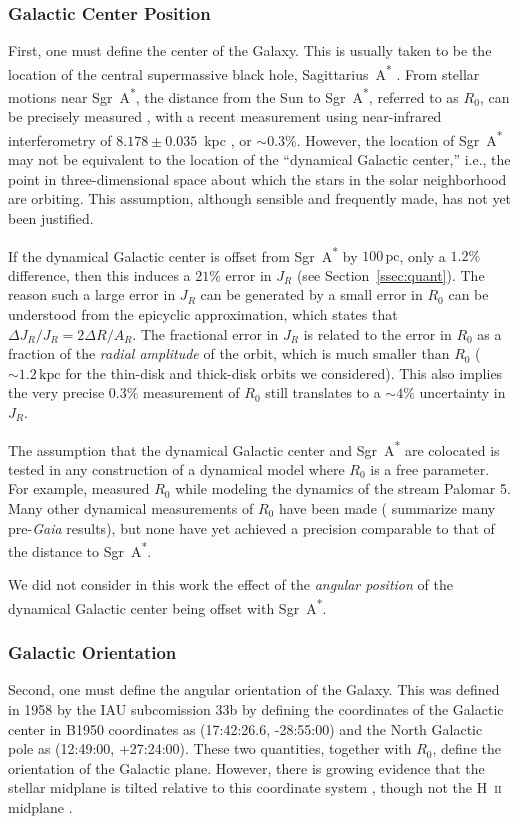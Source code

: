 \documentclass[twocolumn]{aastex62}
\newcommand{\pc}{\text{pc}}
\newcommand{\kpc}{\text{kpc}}
\newcommand{\sgra}{Sgr~A\textsuperscript{*}}
\begin{document}
\subsubsection{Galactic Center Position}
First, one must define the center of the Galaxy. This is usually taken to be
the location of the central supermassive black hole, Sagittarius~A\textsuperscript{*}
\citep[\sgra{}, e.g.][]{2004ApJ...616..872R}. From stellar motions near
\sgra{}, the distance from the Sun to \sgra{}, referred to as $R_0$, can be
precisely measured \citep{2009ApJ...692.1075G, 2018AA...615L..15G}, with a
recent measurement using near-infrared interferometry of $8.178 \pm 0.035$~kpc
\citep{2019arXiv190405721A}, or $\sim0.3\%$. However, the location of \sgra{} may not be equivalent to the location of the ``dynamical Galactic center,'' i.e., the
point in three-dimensional space about which the stars in the solar
neighborhood are orbiting. This assumption, although sensible and frequently
made, has not yet been justified.

If the dynamical Galactic center is offset from \sgra{} by $100\,\pc$, only a
$1.2\%$ difference, then this induces a $21\%$ error in $J_R$ (see
Section~\ref{ssec:quant}). The reason such a large error in $J_R$ can be
generated by a small error in $R_0$ can be understood from the epicyclic
approximation, which states that $\Delta J_R/J_R = 2\Delta R/A_R$. The
fractional error in $J_R$ is related to the error in $R_0$ as a fraction of
the {\em radial amplitude} of the orbit, which is much smaller than $R_0$
($\sim1.2\,\kpc$ for the thin-disk and thick-disk orbits we considered). This
also implies the very precise $0.3\%$ measurement of $R_0$ still translates to
a $\sim4\%$ uncertainty in $J_R$.

The assumption that the dynamical Galactic center and \sgra{} are colocated is
tested in any construction of a dynamical model where $R_0$ is a free
parameter. For example, \citet{2015ApJ...803...80K} measured $R_0$ while
modeling the dynamics of the stream Palomar 5. Many other dynamical
measurements of $R_0$ have been made (\citealt{2016ARAA..54..529B} summarize
many pre-\textit{Gaia} results), but none have yet achieved a precision
comparable to that of the distance to \sgra{}.

We did not consider in this work the effect of the \emph{angular position} of
the dynamical Galactic center being offset with \sgra{}.

\subsubsection{Galactic Orientation}
Second, one must define the angular orientation of the Galaxy. This was
defined in 1958 by the IAU subcomission 33b \citep{1960MNRAS.121..123B} by
defining the coordinates of the Galactic center in B1950 coordinates as
(17:42:26.6, -28:55:00) and the North Galactic pole as (12:49:00, +27:24:00).
These two quantities, together with $R_0$, define the orientation of the
Galactic plane. However, there is growing evidence that the stellar midplane
is tilted relative to this coordinate system \citep{2014ApJ...797...53G,
2016ARAA..54..529B}, though not the H~\textsc{ii} midplane
\citep{2019ApJ...871..145A}.
\end{document}
